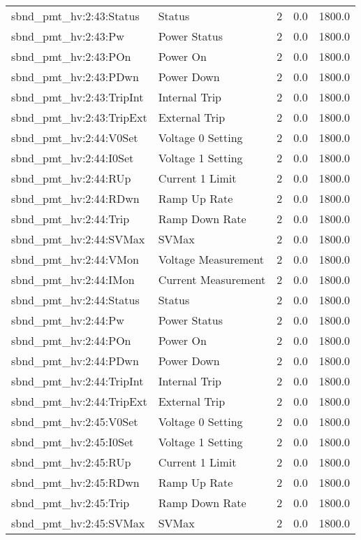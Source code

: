 \begin{center}
\begin{longtable}{l | l l l l }
sbnd\_pmt\_hv:2:43:Status & Status & 2 & 0.0 & 1800.0\\ 
sbnd\_pmt\_hv:2:43:Pw & Power Status & 2 & 0.0 & 1800.0\\ 
sbnd\_pmt\_hv:2:43:POn & Power On & 2 & 0.0 & 1800.0\\ 
sbnd\_pmt\_hv:2:43:PDwn & Power Down & 2 & 0.0 & 1800.0\\ 
sbnd\_pmt\_hv:2:43:TripInt & Internal Trip & 2 & 0.0 & 1800.0\\ 
sbnd\_pmt\_hv:2:43:TripExt & External Trip & 2 & 0.0 & 1800.0\\ 
sbnd\_pmt\_hv:2:44:V0Set & Voltage 0 Setting & 2 & 0.0 & 1800.0\\ 
sbnd\_pmt\_hv:2:44:I0Set & Voltage 1 Setting & 2 & 0.0 & 1800.0\\ 
sbnd\_pmt\_hv:2:44:RUp & Current 1 Limit & 2 & 0.0 & 1800.0\\ 
sbnd\_pmt\_hv:2:44:RDwn & Ramp Up Rate & 2 & 0.0 & 1800.0\\ 
sbnd\_pmt\_hv:2:44:Trip & Ramp Down Rate & 2 & 0.0 & 1800.0\\ 
sbnd\_pmt\_hv:2:44:SVMax & SVMax & 2 & 0.0 & 1800.0\\ 
sbnd\_pmt\_hv:2:44:VMon & Voltage Measurement & 2 & 0.0 & 1800.0\\ 
sbnd\_pmt\_hv:2:44:IMon & Current Measurement & 2 & 0.0 & 1800.0\\ 
sbnd\_pmt\_hv:2:44:Status & Status & 2 & 0.0 & 1800.0\\ 
sbnd\_pmt\_hv:2:44:Pw & Power Status & 2 & 0.0 & 1800.0\\ 
sbnd\_pmt\_hv:2:44:POn & Power On & 2 & 0.0 & 1800.0\\ 
sbnd\_pmt\_hv:2:44:PDwn & Power Down & 2 & 0.0 & 1800.0\\ 
sbnd\_pmt\_hv:2:44:TripInt & Internal Trip & 2 & 0.0 & 1800.0\\ 
sbnd\_pmt\_hv:2:44:TripExt & External Trip & 2 & 0.0 & 1800.0\\ 
sbnd\_pmt\_hv:2:45:V0Set & Voltage 0 Setting & 2 & 0.0 & 1800.0\\ 
sbnd\_pmt\_hv:2:45:I0Set & Voltage 1 Setting & 2 & 0.0 & 1800.0\\ 
sbnd\_pmt\_hv:2:45:RUp & Current 1 Limit & 2 & 0.0 & 1800.0\\ 
sbnd\_pmt\_hv:2:45:RDwn & Ramp Up Rate & 2 & 0.0 & 1800.0\\ 
sbnd\_pmt\_hv:2:45:Trip & Ramp Down Rate & 2 & 0.0 & 1800.0\\ 
sbnd\_pmt\_hv:2:45:SVMax & SVMax & 2 & 0.0 & 1800.0\\ 

\end{longtable}
\end{center}
